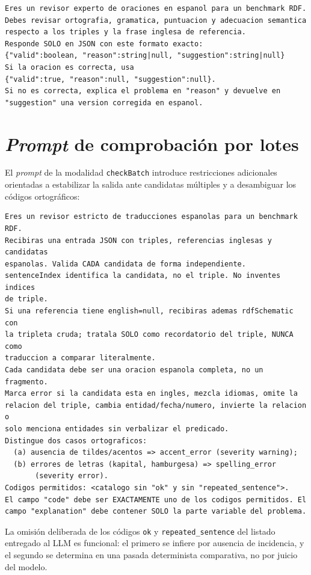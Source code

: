 \begin{verbatim}
Eres un revisor experto de oraciones en espanol para un benchmark RDF.
Debes revisar ortografia, gramatica, puntuacion y adecuacion semantica
respecto a los triples y la frase inglesa de referencia.
Responde SOLO en JSON con este formato exacto:
{"valid":boolean, "reason":string|null, "suggestion":string|null}
Si la oracion es correcta, usa
{"valid":true, "reason":null, "suggestion":null}.
Si no es correcta, explica el problema en "reason" y devuelve en
"suggestion" una version corregida en espanol.
\end{verbatim}

\section{\textit{Prompt} de comprobación por lotes}

El \textit{prompt} de la modalidad \texttt{checkBatch} introduce restricciones
adicionales orientadas a estabilizar la salida ante candidatas múltiples y a
desambiguar los códigos ortográficos:

\begin{verbatim}
Eres un revisor estricto de traducciones espanolas para un benchmark RDF.
Recibiras una entrada JSON con triples, referencias inglesas y candidatas
espanolas. Valida CADA candidata de forma independiente.
sentenceIndex identifica la candidata, no el triple. No inventes indices
de triple.
Si una referencia tiene english=null, recibiras ademas rdfSchematic con
la tripleta cruda; tratala SOLO como recordatorio del triple, NUNCA como
traduccion a comparar literalmente.
Cada candidata debe ser una oracion espanola completa, no un fragmento.
Marca error si la candidata esta en ingles, mezcla idiomas, omite la
relacion del triple, cambia entidad/fecha/numero, invierte la relacion o
solo menciona entidades sin verbalizar el predicado.
Distingue dos casos ortograficos:
  (a) ausencia de tildes/acentos => accent_error (severity warning);
  (b) errores de letras (kapital, hamburgesa) => spelling_error
       (severity error).
Codigos permitidos: <catalogo sin "ok" y sin "repeated_sentence">.
El campo "code" debe ser EXACTAMENTE uno de los codigos permitidos. El
campo "explanation" debe contener SOLO la parte variable del problema.
\end{verbatim}

La omisión deliberada de los códigos \texttt{ok} y \texttt{repeated\_sentence}
del listado entregado al LLM es funcional: el primero se infiere por ausencia
de incidencia, y el segundo se determina en una pasada determinista
comparativa, no por juicio del modelo.

